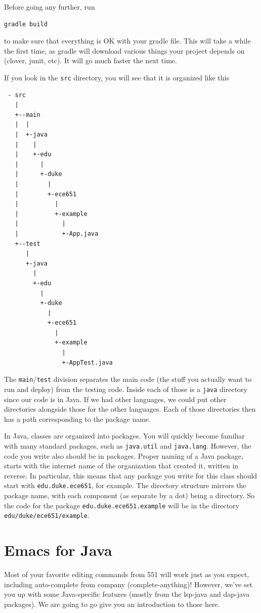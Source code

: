 \documentclass[12pt]{article}
\begin{document}
Before going any further, run
\begin{verbatim}
gradle build
\end{verbatim}

to make sure that everything is OK with your gradle file.  This will
take a while the first time, as gradle will download various
things your project depends on (clover, junit, etc). It will go
much faster the next time.



 If you look in the \verb+src+ directory, you
will see that it is organized like this
\begin{verbatim}
 - src 
   | 
   +--main 
   |  | 
   |  +-java 
   |    |  
   |    +-edu
   |      |
   |      +-duke
   |        |
   |        +-ece651
   |          |
   |          +-example
   |            |
   |            +-App.java
   +--test 
      |
      +-java 
        |  
        +-edu
          |
          +-duke
            |
            +-ece651
              |
              +-example
                |
                +-AppTest.java
\end{verbatim}

The \verb+main+/\verb+test+ division separates the main code (the
stuff you actually want to run and deploy) from the testing code.
Inside each of those is a \verb+java+ directory since our code is in
Java.  If we had other languages, we could put other directories
alongside those for the other languages.  Each of those directories
then has a path corresponding to the package name.  

In Java, classes are organized into packages.  You will quickly become
familiar with many standard packages, such as \verb+java.util+ and
\verb+java.lang+.  However, the code you write also should be in
packages.    Proper naming of a Java
package, starts with the internet name of the organization
that created it, written in reverse.  In particular, this means that
any package you write for this class should start with
\verb+edu.duke.ece651+, for example.  The directory structure
mirrors the package name, with each component (as separate
by a dot) being a directory.  So the code for the package
\verb+edu.duke.ece651.example+ will be in the directory
\verb+edu/duke/ece651/example+.

\section{Emacs for Java}
Most of your favorite editing commands from 551 will work just as you expect,
including auto-complete from company (complete-anything)!
However, we've set you up with some Java-specific features (mostly from
the lsp-java and dap-java packages). We are going to go give you an introduction
to those here.
\end{document}
